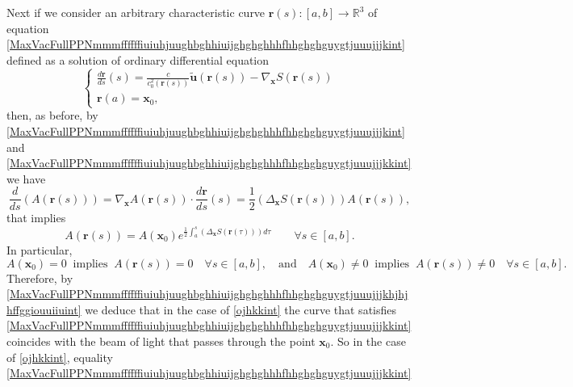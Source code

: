 \documentclass{article}
\theoremstyle{definition}
\theoremstyle{remark}
\renewcommand{\vec}[1]{\mathbf{#1}}
\newcommand{\er}{\eqref}
\newcommand{\er}{\eqref}
\begin{document}
Next if we consider an arbitrary characteristic curve $\vec
r(s):[a,b]\to\mathbb{R}^3$ of equation
\er{MaxVacFullPPNmmmffffffiuiuhjuughbghhiuijghghghhhfhhghghguygtjuuujjjkint}
defined as a solution of ordinary differential equation
\begin{equation}\label{MaxVacFullPPNmmmffffffiuiuhjuughbghhiuijghghghhhfhhghghguygtjuuujjjkkint}
\begin{cases}
\frac{d\vec r}{ds}(s)=\frac{c}{c^2_0\left(\vec r(s)\right)}\vec
{\tilde u}\left(\vec
r(s)\right)-\nabla_{\vec x}S\left(\vec r(s)\right)\\
\vec r(a)=\vec x_0,
\end{cases}
\end{equation}
then, as before, by
\er{MaxVacFullPPNmmmffffffiuiuhjuughbghhiuijghghghhhfhhghghguygtjuuujjjkint}
and
\er{MaxVacFullPPNmmmffffffiuiuhjuughbghhiuijghghghhhfhhghghguygtjuuujjjkkint}
we have
\begin{equation}\label{MaxVacFullPPNmmmffffffiuiuhjuughbghhiuijghghghhhfhhghghguygtjuuujjjkhjhjhint}
\frac{d}{ds}\left(A\left(\vec r(s)\right)\right)=\nabla_{\vec
x}A\left(\vec r(s)\right)\cdot\frac{d\vec
r}{ds}(s)=\frac{1}{2}\left(\Delta_{\vec x}S\left(\vec
r(s)\right)\right)A\left(\vec r(s)\right),
\end{equation}
that implies
\begin{equation}\label{MaxVacFullPPNmmmffffffiuiuhjuughbghhiuijghghghhhfhhghghguygtjuuujjjkhjhjhffggint}
A\left(\vec r(s)\right)=A\left(\vec
x_0\right)e^{\frac{1}{2}\int_a^{s}\left(\Delta_{\vec x}S\left(\vec
r(\tau)\right)\right)d\tau}\quad\quad\forall s\in[a,b].
\end{equation}
In particular,
\begin{equation}\label{MaxVacFullPPNmmmffffffiuiuhjuughbghhiuijghghghhhfhhghghguygtjuuujjjkhjhjhffggiouuiiuint}
A\left(\vec x_0\right)=0\;\;\text{implies}\;\; A\left(\vec
r(s)\right)=0\quad\forall s\in[a,b],\quad\text{and}\quad A\left(\vec
x_0\right)\neq 0\;\;\text{implies}\;\; A\left(\vec r(s)\right)\neq
0\quad\forall s\in[a,b].
\end{equation}
Therefore, by
\er{MaxVacFullPPNmmmffffffiuiuhjuughbghhiuijghghghhhfhhghghguygtjuuujjjkhjhjhffggiouuiiuint}
we deduce that in the case of \er{ojhkkint} the curve that satisfies
\er{MaxVacFullPPNmmmffffffiuiuhjuughbghhiuijghghghhhfhhghghguygtjuuujjjkkint}
coincides with the beam of light that passes through the point $\vec
x_0$. So in the case of \er{ojhkkint}, equality
\er{MaxVacFullPPNmmmffffffiuiuhjuughbghhiuijghghghhhfhhghghguygtjuuujjjkkint}
\end{document}
